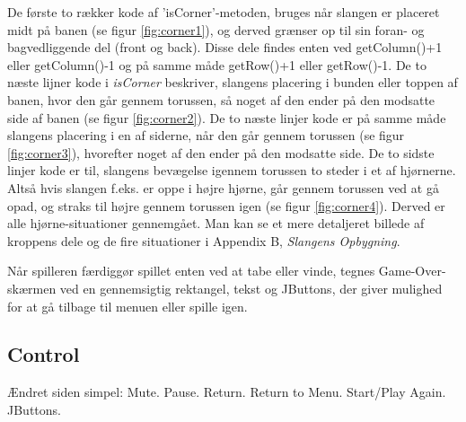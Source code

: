 De første to rækker kode af 'isCorner'-metoden, bruges når slangen er placeret midt på banen (se figur \ref{fig:corner1}), og derved grænser op til sin foran- og bagvedliggende del (front og back). Disse dele findes enten ved getColumn()+1 eller getColumn()-1 og på samme måde getRow()+1 eller getRow()-1. De to næste lijner kode i \textit{isCorner} beskriver, slangens placering i bunden eller toppen af banen, hvor den går gennem torussen, så noget af den ender på den modsatte side af banen (se figur \ref{fig:corner2}).
De to næste linjer kode er på samme måde slangens placering i en af siderne, når den går gennem torussen (se figur \ref{fig:corner3}), hvorefter noget af den ender på den modsatte side.
De to sidste linjer kode er til, slangens bevægelse igennem torussen to steder i et af hjørnerne. Altså hvis slangen f.eks. er oppe i højre hjørne, går gennem torussen ved at gå opad, og straks til højre gennem torussen igen (se figur \ref{fig:corner4}).
Derved er alle hjørne-situationer gennemgået.
Man kan se et mere detaljeret billede af kroppens dele og de fire situationer i Appendix B, \textit{Slangens Opbygning}.

\begin{figure}[h]
	\centering
	\graphicspath{ {pics/} }
	\caption{}
	\hspace{0.05\textwidth}
	\hspace{0.05\textwidth}
	\hspace{0.05\textwidth}
\end{figure}

Når spilleren færdiggør spillet enten ved at tabe eller vinde, tegnes Game-Over-skærmen ved en gennemsigtig rektangel, tekst og JButtons, der giver mulighed for at gå tilbage til menuen eller spille igen.

\subsection{Control}
Ændret siden simpel: Mute. Pause. Return. Return to Menu. Start/Play Again. JButtons.
\newline

